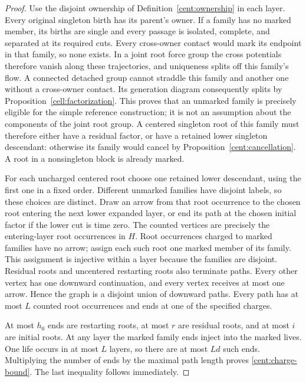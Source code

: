\begin{proof}
Use the disjoint ownership of Definition~\ref{cent:ownership} in each
layer. Every original singleton birth has its parent's owner. If a
family has no marked member, its births are single and every passage
is isolated, complete, and separated at its required cuts. Every
cross-owner contact would mark its endpoint in that family, so none
exists. In a joint root force group the cross potentials therefore
vanish along these trajectories, and uniqueness splits off this
family's flow. A connected detached group cannot straddle this family
and another one without a cross-owner contact. Its generation diagram
consequently splits by Proposition~\ref{cell:factorization}. This
proves that an unmarked family is precisely eligible for the simple
reference construction; it is not an assumption about the components
of the joint root group. A centered
singleton root of this family must therefore either have a residual
factor, or have a retained lower singleton descendant: otherwise its
family would cancel by Proposition~\ref{cent:cancellation}. A root
in a nonsingleton block is already marked.

For each uncharged centered root choose one retained lower descendant,
using the first one in a fixed order. Different unmarked families
have disjoint labels, so these choices are distinct. Draw an arrow
from that root occurrence to the chosen root entering the next lower
expanded layer, or end its path at the chosen initial factor if the
lower cut is time zero. The counted vertices are precisely the
entering-layer root occurrences in $H$. Root
occurrences charged to marked families have no arrow; assign each
such root one marked member of its family. This assignment is
injective within a layer because the families are disjoint.
Residual roots and uncentered restarting roots also terminate paths.
Every other vertex has one downward continuation, and every vertex
receives at most one arrow. Hence the graph is a disjoint union of
downward paths. Every path has at most $L$ counted root occurrences
and ends at one of the specified charges.

At most $h_0$ ends are restarting roots, at most $r$ are residual
roots, and at most $i$ are initial roots. At any layer the marked
family ends inject into the marked lives. One life occurs in at most
$L$ layers, so there are at most $Ld$ such ends. Multiplying the
number of ends by the maximal path length proves
\eqref{cent:charge-bound}. The last inequality follows immediately.
\end{proof}

